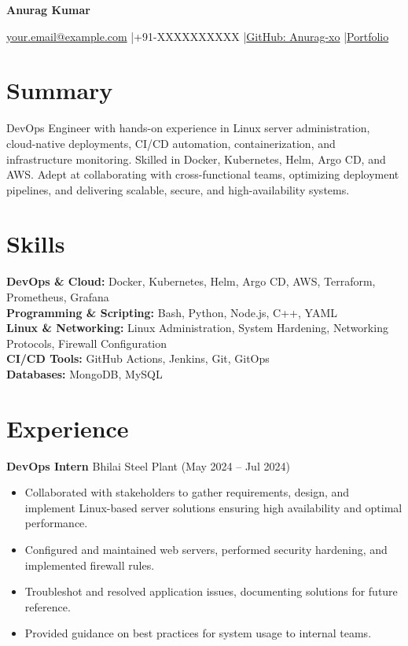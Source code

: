 \documentclass[a4paper,10pt]{article}
\begin{document}
\centerline{\huge \bf Anurag Kumar}
\centerline{\href{mailto:your.email@example.com}{your.email@example.com} \quad|\quad +91-XXXXXXXXXX \quad|\quad \href{https://github.com/Anurag-xo}{GitHub: Anurag-xo} \quad|\quad \href{https://your-portfolio-link.com}{Portfolio}}

\section{Summary}
DevOps Engineer with hands-on experience in Linux server administration, cloud-native deployments, CI/CD automation, containerization, and infrastructure monitoring. Skilled in Docker, Kubernetes, Helm, Argo CD, and AWS. Adept at collaborating with cross-functional teams, optimizing deployment pipelines, and delivering scalable, secure, and high-availability systems.

\section{Skills}
\textbf{DevOps \& Cloud:} Docker, Kubernetes, Helm, Argo CD, AWS, Terraform, Prometheus, Grafana \\
\textbf{Programming \& Scripting:} Bash, Python, Node.js, C++, YAML \\
\textbf{Linux \& Networking:} Linux Administration, System Hardening, Networking Protocols, Firewall Configuration \\
\textbf{CI/CD Tools:} GitHub Actions, Jenkins, Git, GitOps \\
\textbf{Databases:} MongoDB, MySQL

\section{Experience}
\textbf{DevOps Intern} \hfill Bhilai Steel Plant \quad (May 2024 – Jul 2024) \\
\begin{itemize}
    \item Collaborated with stakeholders to gather requirements, design, and implement Linux-based server solutions ensuring high availability and optimal performance.
    \item Configured and maintained web servers, performed security hardening, and implemented firewall rules.
    \item Troubleshot and resolved application issues, documenting solutions for future reference.
    \item Provided guidance on best practices for system usage to internal teams.
\end{itemize}
\end{document}
